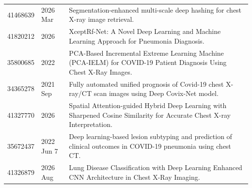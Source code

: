 \begin{longtable}{llp{9.5cm}}
41468639 & 2026 Mar & Segmentation-enhanced multi-scale deep hashing for chest X-ray image retrieval. \\
41820212 & 2026 & XceptRf-Net: A Novel Deep Learning and Machine Learning Approach for Pneumonia Diagnosis. \\
35800685 & 2022 & PCA-Based Incremental Extreme Learning Machine (PCA-IELM) for COVID-19 Patient Diagnosis Using Chest X-Ray Images. \\
34365278 & 2021 Sep & Fully automated unified prognosis of Covid-19 chest X-ray/CT scan images using Deep Covix-Net model. \\
41327770 & 2026 & Spatial Attention-guided Hybrid Deep Learning with Sharpened Cosine Similarity for Accurate Chest X-ray Interpretation. \\
35672437 & 2022 Jun 7 & Deep learning-based lesion subtyping and prediction of clinical outcomes in COVID-19 pneumonia using chest CT. \\
41326879 & 2026 Aug & Lung Disease Classification with Deep Learning Enhanced CNN Architecture in Chest X-Ray Imaging. \\
\hline
\end{longtable}
